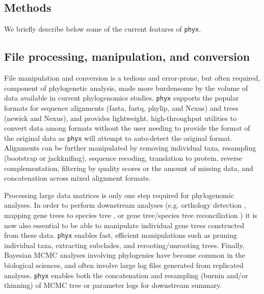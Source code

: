 \documentclass{bioinfo}
\begin{document}
\begin{methods}
\section{Methods}

We briefly describe below some of the current features of \texttt{phyx}.

\subsection{File processing, manipulation, and conversion}

File manipulation and conversion is a tedious and error-prone, but often required,
component of phylogenetic analysis, made more burdensome by the volume of data
available in current phylogenomics studies. \texttt{phyx} supports the
popular formats for sequence alignments (fasta, fastq, phylip, and Nexus)
and trees (newick and Nexus), and provides lightweight, high-throughput
utilities to convert data among formats without the user needing to
provide the format of the original data as \texttt{phyx} will attempt to auto-detect the original format. Alignments can be further
manipulated by removing individual taxa, resampling (bootstrap or
jackknifing), sequence recoding, translation to protein, reverse
complementation, filtering by quality scores or the amount of missing
data, and concatenation across mixed alignment formats. 

Processing large data matrices is only one step required for phylogenomic analyses. In order to perform downstream analyses (e.g. orthology detection \citep{YangSmith2014}, mapping gene
trees to species tree \citep{Smith2015}, or gene tree/species tree reconciliation \citep{Mirarab2014}) it is now also essential to be able to manipulate individual gene trees constructed from these data.
\texttt{phyx} enables fast, efficient manipulations such as pruning
individual taxa, extracting subclades, and rerooting/unrooting trees.
Finally, Bayesian MCMC analyses involving phylogenies have become common in the biological sciences, and often involve
large log files generated from replicated analyses. \texttt{phyx} enables
both the concatenation and resampling (burnin and/or thinning) of MCMC
tree or parameter logs for downstream summary.


\end{methods}
\end{document}
